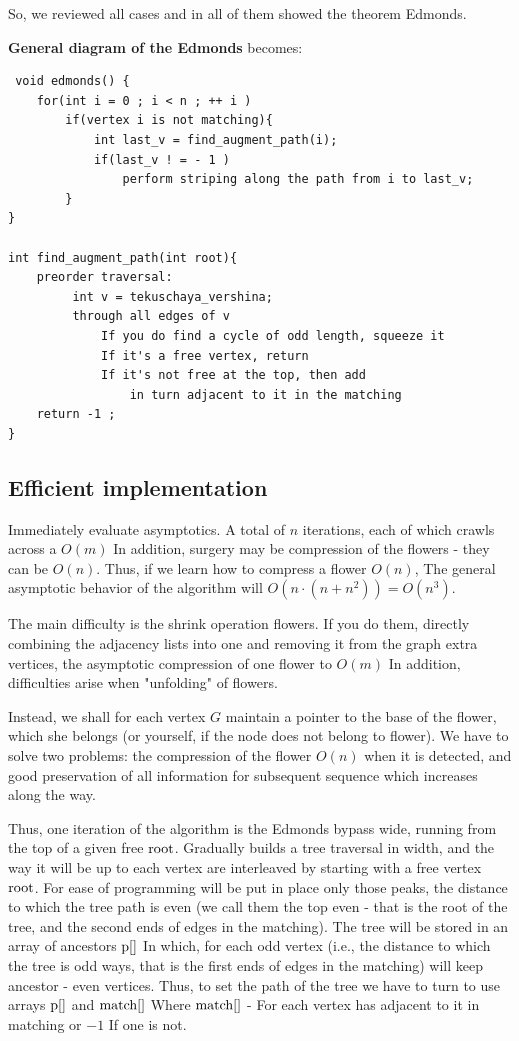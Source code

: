 So, we reviewed all cases and in all of them showed the theorem Edmonds.

\textbf{General diagram of the Edmonds} becomes:

\begin{verbatim}
 void edmonds() {
    for(int i = 0 ; i < n ; ++ i )
        if(vertex i is not matching){
            int last_v = find_augment_path(i);
            if(last_v ! = - 1 )
                perform striping along the path from i to last_v;
        }
}
 
int find_augment_path(int root){
    preorder traversal:
         int v = tekuschaya_vershina;
         through all edges of v
             If you do find a cycle of odd length, squeeze it
             If it's a free vertex, return
             If it's not free at the top, then add
                 in turn adjacent to it in the matching
    return -1 ;
} 
\end{verbatim}
\subsection{ Efficient implementation }

Immediately evaluate asymptotics. A total of $n$ iterations, each of which crawls across a $O (m)$ In addition, surgery may be compression of the flowers - they can be $O (n)$. Thus, if we learn how to compress a flower $O (n)$, The general asymptotic behavior of the algorithm will $O (n \cdot (n + n ^ 2)) = O (n ^ 3)$.

The main difficulty is the shrink operation flowers. If you do them, directly combining the adjacency lists into one and removing it from the graph extra vertices, the asymptotic compression of one flower to $O (m)$ In addition, difficulties arise when "unfolding" of flowers.

Instead, we shall for each vertex $G$ maintain a pointer to the base of the flower, which she belongs (or yourself, if the node does not belong to flower). We have to solve two problems: the compression of the flower $O (n)$ when it is detected, and good preservation of all information for subsequent sequence which increases along the way.

Thus, one iteration of the algorithm is the Edmonds bypass wide, running from the top of a given free $\rm root$. Gradually builds a tree traversal in width, and the way it will be up to each vertex are interleaved by starting with a free vertex $\rm root$. For ease of programming will be put in place only those peaks, the distance to which the tree path is even (we call them the top even - that is the root of the tree, and the second ends of edges in the matching). The tree will be stored in an array of ancestors $\rm p []$ In which, for each odd vertex (i.e., the distance to which the tree is odd ways, that is the first ends of edges in the matching) will keep ancestor - even vertices. Thus, to set the path of the tree we have to turn to use arrays $\rm p []$ and $\rm match []$ Where $\rm match []$ - For each vertex has adjacent to it in matching or $-1$ If one is not.

